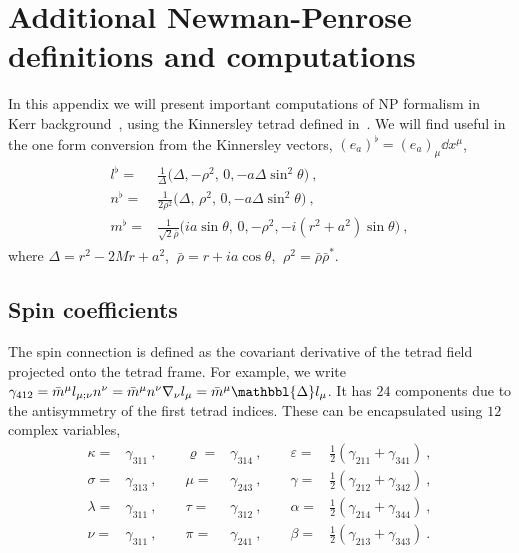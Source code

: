 
\chapter{Additional Newman-Penrose definitions and computations} %
\label{AppendixNPFormalism}

In this appendix we will present important computations of NP formalism in Kerr background~, using the Kinnersley tetrad defined in~.
We will find useful in the one form conversion from the Kinnersley vectors, $(e_a)^\flat = (e_a)_\mu \dd x^\mu$,
\begin{align}
    \begin{split}
        l^\flat =& \frac{1}{\Delta} \Bigr(\Delta, -\rho^2, \,0, -a \Delta \sin^2\theta \Bigr) ~, \\
        n^\flat =& \frac{1}{2 \rho^2} \Bigr(\Delta, \,\rho^2, \,0, -a \Delta \sin^2\theta \Bigr) ~, \\
        m^\flat =& \frac{1}{ \sqrt{2} \bar{\rho} } \Bigr( i a \sin\theta, \,0, -\rho^2, - i (r^2+a^2) \sin\theta \Bigr) ~,
    \end{split}
\end{align}
where $\Delta=r^2-2 M r + a^2$, $~\bar{\rho} = r + i a \cos\theta$, $~\rho^2 = \bar{\rho} \bar{\rho}^*$.

\section{Spin coefficients}
\label{AppendixNPSpinCoef}

The spin connection is defined as the covariant derivative of the tetrad field projected onto the tetrad frame. 
For example, we write $\gamma_{412} = \bar{m}^\mu l_{\mu;\nu} n^\nu =  \bar{m}^\mu n^\nu \nabla_\nu l_{\mu} = \bar{m}^\mu \mathbbl{\Delta} l_\mu$.
It has $24$ components due to the antisymmetry of the first tetrad indices. These can be encapsulated using $12$ complex variables,
\begin{equation}
    \begin{alignedat}{4}
        \kappa  =& \gamma_{311} ~,\qquad \varrho =& \gamma_{314} ~,\qquad \varepsilon =& \tfrac{1}{2} (\gamma_{211} + \gamma_{341}) ~, \\
        \sigma  =& \gamma_{313} ~,\qquad \mu     =& \gamma_{243} ~,\qquad \gamma      =& \tfrac{1}{2} (\gamma_{212} + \gamma_{342}) ~, \\
        \lambda =& \gamma_{311} ~,\qquad \tau    =& \gamma_{312} ~,\qquad \alpha      =& \tfrac{1}{2} (\gamma_{214} + \gamma_{344}) ~, \\
        \nu     =& \gamma_{311} ~,\qquad \pi     =& \gamma_{241} ~,\qquad \beta       =& \tfrac{1}{2} (\gamma_{213} + \gamma_{343}) ~.
    \end{alignedat}
\end{equation}

